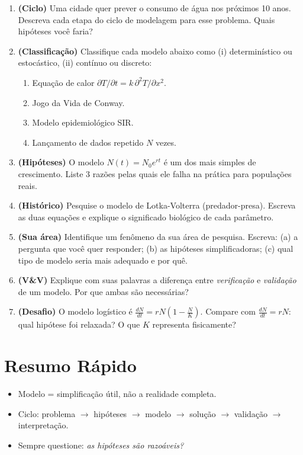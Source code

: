\documentclass[12pt,a4paper]{article}
\begin{document}
\begin{enumerate}
  \item \textbf{(Ciclo)} Uma cidade quer prever o consumo de \'agua nos pr\'oximos 10 anos. Descreva cada etapa do ciclo de modelagem para esse problema. Quais hip\'oteses voc\^e faria?
  
  \item \textbf{(Classifica\c{c}\~ao)} Classifique cada modelo abaixo como (i) determin\'istico ou estoc\'astico, (ii) cont\'inuo ou discreto:
    \begin{enumerate}
      \item[$a.$] Equa\c{c}\~ao de calor $\partial T/\partial t = k\,\partial^2 T/\partial x^2$.
      \item[$b.$] Jogo da Vida de Conway.
      \item[$c.$] Modelo epidemiol\'ogico SIR.
      \item[$d.$] Lan\c{c}amento de dados repetido $N$ vezes.
    \end{enumerate}
  
  \item \textbf{(Hip\'oteses)} O modelo $N(t)=N_0 e^{rt}$ \'e um dos mais simples de crescimento. Liste 3 raz\~oes pelas quais ele falha na pr\'atica para popula\c{c}\~oes reais.
  
  \item \textbf{(Hist\'orico)} Pesquise o modelo de Lotka-Volterra (predador-presa). Escreva as duas equa\c{c}\~oes e explique o significado biol\'ogico de cada par\^ametro.
  
  \item \textbf{(Sua \'area)} Identifique um fen\^omeno da sua \'area de pesquisa. Escreva: (a) a pergunta que voc\^e quer responder; (b) as hip\'oteses simplificadoras; (c) qual tipo de modelo seria mais adequado e por qu\^e.
  
  \item \textbf{(V\&V)} Explique com suas palavras a diferen\c{c}a entre \emph{verifica\c{c}\~ao} e \emph{valida\c{c}\~ao} de um modelo. Por que ambas s\~ao necess\'arias?
  
  \item \textbf{(Desafio)} O modelo log\'istico \'e $\frac{dN}{dt}=rN\!\left(1-\frac{N}{K}\right)$. Compare com $\frac{dN}{dt}=rN$: qual hip\'otese foi relaxada? O que $K$ representa fisicamente?
\end{enumerate}

\section*{Resumo R\'apido}
\begin{itemize}
  \item Modelo = simplifica\c{c}\~ao \'util, n\~ao a realidade completa.
  \item Ciclo: problema $\to$ hip\'oteses $\to$ modelo $\to$ solu\c{c}\~ao $\to$ valida\c{c}\~ao $\to$ interpreta\c{c}\~ao.
  \item Sempre questione: \emph{as hip\'oteses s\~ao razo\'aveis?}
\end{itemize}
\end{document}
